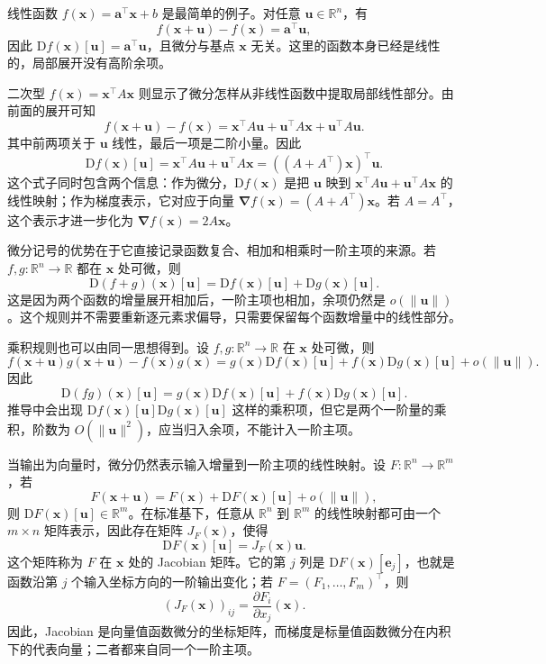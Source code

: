 线性函数 \(f(\bm{x})=\bm{a}^\top \bm{x}+b\) 是最简单的例子。对任意 \(\bm{u}\in\mathbb{R}^n\)，有
\[
f(\bm{x}+\bm{u})-f(\bm{x})=\bm{a}^\top \bm{u},
\]
因此 \(\mathrm{D}f(\bm{x})[\bm{u}]=\bm{a}^\top \bm{u}\)，且微分与基点 \(\bm{x}\) 无关。这里的函数本身已经是线性的，局部展开没有高阶余项。

二次型 \(f(\bm{x})=\bm{x}^\top A\bm{x}\) 则显示了微分怎样从非线性函数中提取局部线性部分。由前面的展开可知
\[
f(\bm{x}+\bm{u})-f(\bm{x})=\bm{x}^\top A\bm{u}+\bm{u}^\top A\bm{x}+\bm{u}^\top A\bm{u}.
\]
其中前两项关于 \(\bm{u}\) 线性，最后一项是二阶小量。因此
\[
\mathrm{D}f(\bm{x})[\bm{u}]=\bm{x}^\top A\bm{u}+\bm{u}^\top A\bm{x}=((A+A^\top)\bm{x})^\top \bm{u}.
\]
这个式子同时包含两个信息：作为微分，\(\mathrm{D}f(\bm{x})\) 是把 \(\bm{u}\) 映到 \(\bm{x}^\top A\bm{u}+\bm{u}^\top A\bm{x}\) 的线性映射；作为梯度表示，它对应于向量 \(\bm{\nabla} f(\bm{x})=(A+A^\top)\bm{x}\)。若 \(A=A^\top\)，这个表示才进一步化为 \(\bm{\nabla} f(\bm{x})=2A\bm{x}\)。

微分记号的优势在于它直接记录函数复合、相加和相乘时一阶主项的来源。若 \(f,g:\mathbb{R}^n\to\mathbb{R}\) 都在 \(\bm{x}\) 处可微，则
\[
\mathrm{D}(f+g)(\bm{x})[\bm{u}]=\mathrm{D}f(\bm{x})[\bm{u}]+\mathrm{D}g(\bm{x})[\bm{u}].
\]
这是因为两个函数的增量展开相加后，一阶主项也相加，余项仍然是 \(o(\|\bm{u}\|)\)。这个规则并不需要重新逐元素求偏导，只需要保留每个函数增量中的线性部分。

乘积规则也可以由同一思想得到。设 \(f,g:\mathbb{R}^n\to\mathbb{R}\) 在 \(\bm{x}\) 处可微，则
\[
f(\bm{x}+\bm{u})g(\bm{x}+\bm{u})-f(\bm{x})g(\bm{x})=g(\bm{x})\mathrm{D}f(\bm{x})[\bm{u}]+f(\bm{x})\mathrm{D}g(\bm{x})[\bm{u}]+o(\|\bm{u}\|).
\]
因此
\[
\mathrm{D}(fg)(\bm{x})[\bm{u}]=g(\bm{x})\mathrm{D}f(\bm{x})[\bm{u}]+f(\bm{x})\mathrm{D}g(\bm{x})[\bm{u}].
\]
推导中会出现 \(\mathrm{D}f(\bm{x})[\bm{u}]\mathrm{D}g(\bm{x})[\bm{u}]\) 这样的乘积项，但它是两个一阶量的乘积，阶数为 \(O(\|\bm{u}\|^2)\)，应当归入余项，不能计入一阶主项。

当输出为向量时，微分仍然表示输入增量到一阶主项的线性映射。设 \(F:\mathbb{R}^n\to\mathbb{R}^m\)，若
\[
F(\bm{x}+\bm{u})=F(\bm{x})+\mathrm{D}F(\bm{x})[\bm{u}]+o(\|\bm{u}\|),
\]
则 \(\mathrm{D}F(\bm{x})[\bm{u}]\in\mathbb{R}^m\)。在标准基下，任意从 \(\mathbb{R}^n\) 到 \(\mathbb{R}^m\) 的线性映射都可由一个 \(m\times n\) 矩阵表示，因此存在矩阵 \(J_F(\bm{x})\)，使得
\[
\mathrm{D}F(\bm{x})[\bm{u}]=J_F(\bm{x})\bm{u}.
\]
这个矩阵称为 \(F\) 在 \(\bm{x}\) 处的 Jacobian 矩阵。它的第 \(j\) 列是 \(\mathrm{D}F(\bm{x})[\bm{e}_j]\)，也就是函数沿第 \(j\) 个输入坐标方向的一阶输出变化；若 \(F=(F_1,\ldots,F_m)^\top\)，则
\[
(J_F(\bm{x}))_{ij}=\frac{\partial F_i}{\partial x_j}(\bm{x}).
\]
因此，Jacobian 是向量值函数微分的坐标矩阵，而梯度是标量值函数微分在内积下的代表向量；二者都来自同一个一阶主项。


